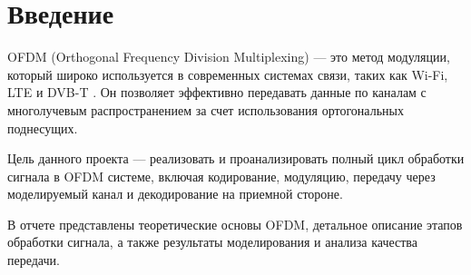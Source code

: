 \chapter*{Введение}

OFDM (Orthogonal Frequency Division Multiplexing) --- это метод модуляции, который широко используется в современных системах связи, таких как Wi-Fi, LTE и DVB-T \cite{vanNee2000}. Он позволяет эффективно передавать данные по каналам с многолучевым распространением за счет использования ортогональных поднесущих.

Цель данного проекта --- реализовать и проанализировать полный цикл обработки сигнала в OFDM системе, включая кодирование, модуляцию, передачу через моделируемый канал и декодирование на приемной стороне.

В отчете представлены теоретические основы OFDM, детальное описание этапов обработки сигнала, а также результаты моделирования и анализа качества передачи.